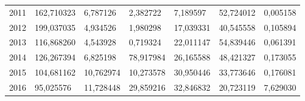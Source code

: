 \begin{table}
\begin{tabular}{p{1cm}p{2cm}p{2cm}p{2cm}p{2cm}p{2cm}p{2cm}}
 2011 &      162,710323 &                 6,787126 &         2,382722 &             7,189597 &                  52,724012 &                     0,005158 \\
 2012 &      199,037035 &                 4,934526 &         1,980298 &            17,039331 &                  40,545558 &                     0,105894 \\
 2013 &      116,868260 &                 4,543928 &         0,719324 &            22,011147 &                  54,839446 &                     0,061391 \\
 2014 &      126,267394 &                 6,825198 &        78,917984 &            26,165588 &                  48,421327 &                     0,173055 \\
 2015 &      104,681162 &                10,762974 &        10,273578 &            30,950446 &                  33,773646 &                     0,176081 \\
 2016 &       95,025576 &                11,728448 &        29,859216 &            32,846832 &                  20,723119 &                     7,629030 \\
\bottomrule
\end{tabular}
\end{table}
